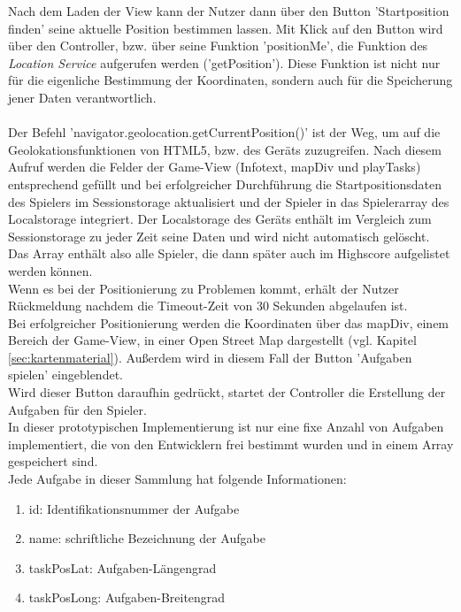 Nach dem Laden der View kann der Nutzer dann über den Button 'Startposition finden' seine aktuelle Position bestimmen lassen. Mit Klick auf den Button wird über den Controller, bzw. über seine Funktion 'positionMe', die Funktion des \emph{Location Service} aufgerufen werden ('getPosition'). Diese Funktion ist nicht nur für die eigenliche Bestimmung der Koordinaten, sondern auch für die Speicherung jener Daten verantwortlich.
\\
\\
Der Befehl 'navigator.geolocation.getCurrentPosition()' ist der Weg, um auf die Geolokationsfunktionen von HTML5, bzw. des Geräts zuzugreifen. Nach diesem Aufruf werden die Felder der Game-View (Infotext, mapDiv und playTasks) entsprechend gefüllt und bei erfolgreicher Durchführung die Startpositionsdaten des Spielers %
im Sessionstorage aktualisiert und der Spieler in das Spielerarray des Localstorage integriert. Der Localstorage des Geräts enthält im Vergleich zum Sessionstorage zu jeder Zeit seine Daten und wird nicht automatisch gelöscht. Das Array enthält also alle Spieler, die dann später auch im Highscore aufgelistet werden können.
\\
Wenn es bei der Positionierung zu Problemen kommt, erhält der Nutzer Rückmeldung nachdem die Timeout-Zeit von 30 Sekunden abgelaufen ist.
\\
Bei erfolgreicher Positionierung werden die Koordinaten über das mapDiv, einem Bereich der Game-View, in einer Open Street Map dargestellt (vgl. Kapitel \ref{sec:kartenmaterial}). Außerdem wird in diesem Fall der Button 'Aufgaben spielen' eingeblendet.
\\
Wird dieser Button daraufhin gedrückt, startet der Controller die Erstellung der Aufgaben für den Spieler.
\\
In dieser prototypischen Implementierung ist nur eine fixe Anzahl von Aufgaben implementiert, die von den Entwicklern frei bestimmt wurden und in einem Array gespeichert sind.
\\
Jede Aufgabe in dieser Sammlung hat folgende Informationen:
\begin{enumerate}
\item id: Identifikationsnummer der Aufgabe
\item name: schriftliche Bezeichnung der Aufgabe
\item taskPosLat: Aufgaben-Längengrad
\item taskPosLong: Aufgaben-Breitengrad
\end{enumerate}

